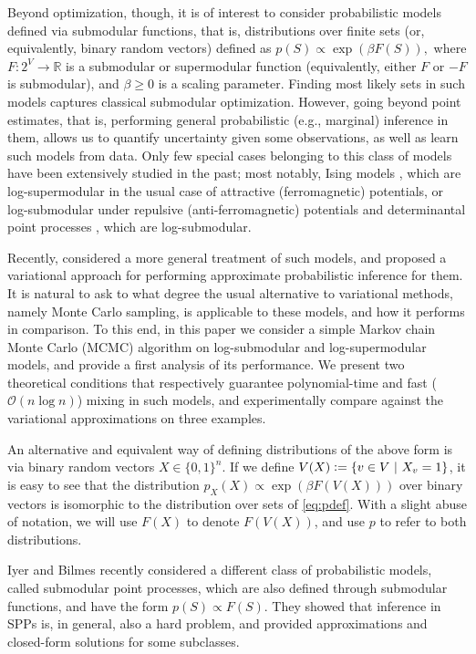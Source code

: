 Beyond optimization, though, it is of interest to consider probabilistic models defined via submodular functions, that is, distributions over finite sets (or, equivalently, binary random vectors) defined as $p(S) \propto \exp(\beta F(S)),$ where $F : 2^V \to \mathbb{R}$ is a submodular or supermodular function (equivalently, either $F$ or $-F$ is submodular), and $\beta \geq 0$ is a scaling parameter.
Finding most likely sets in such models captures classical submodular optimization.
However, going beyond point estimates, that is, performing general probabilistic (e.g., marginal) inference in them, allows us to quantify uncertainty given some observations, as well as learn such models from data.
Only few special cases belonging to this class of models have been extensively studied in the past; most notably, Ising models \cite{koller09}, which are log-supermodular in the usual case of attractive (ferromagnetic) potentials, or log-submodular under repulsive (anti-ferromagnetic) potentials and determinantal point processes \cite{kulesza12}, which are log-submodular.

Recently, \citet{djolonga14} considered a more general treatment of such models, and proposed a variational approach for performing approximate probabilistic inference for them.
It is natural to ask to what degree the usual alternative to variational methods, namely Monte Carlo sampling, is applicable to these models, and how it performs in comparison.
To this end, in this paper we consider a simple Markov chain Monte Carlo (MCMC) algorithm on log-submodular and log-supermodular models, and provide a first analysis of its performance.
We present two theoretical conditions that respectively guarantee polynomial-time and fast ($\mathcal{O}(n \log n)$) mixing in such models, and experimentally compare against the variational approximations on three examples.

An alternative and equivalent way of defining distributions of the above form is via binary random vectors $X \in \{0, 1\}^n$.
If we define $V(X) \vcentcolon= \left\{v \in V\ \middle\vert\  X_v = 1\right\}$, it is easy to see that the distribution $p_X(X) \propto \exp(\beta F(V(X)))$ over binary vectors is isomorphic to the distribution over sets of \eqref{eq:pdef}.
With a slight abuse of notation, we will use $F(X)$ to denote $F(V(X))$, and use $p$ to refer to both distributions.

Iyer and Bilmes \citep{iyer15} recently considered a different class of probabilistic models, called submodular point processes, which are also defined through submodular functions, and have the form $p(S) \propto F(S)$.
They showed that inference in SPPs is, in general, also a hard problem, and provided approximations and closed-form solutions for some subclasses.

